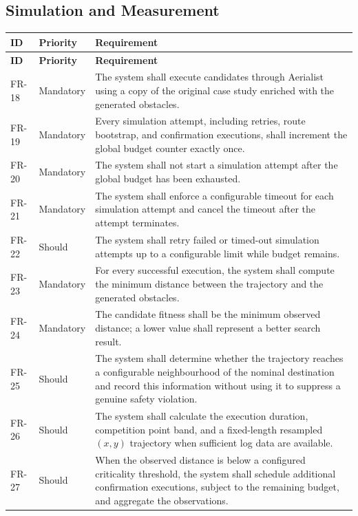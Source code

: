 \documentclass[11pt,a4paper]{report}
\begin{document}
\subsection{Simulation and Measurement}
\begin{longtable}{L{1.7cm} L{2.1cm} L{10.8cm}}
\toprule
\textbf{ID} & \textbf{Priority} & \textbf{Requirement}\\
\midrule
\endfirsthead
\toprule
\textbf{ID} & \textbf{Priority} & \textbf{Requirement}\\
\midrule
\endhead
FR-18 & Mandatory & The system shall execute candidates through Aerialist using a copy of the original case study enriched with the generated obstacles.\\
FR-19 & Mandatory & Every simulation attempt, including retries, route bootstrap, and confirmation executions, shall increment the global budget counter exactly once.\\
FR-20 & Mandatory & The system shall not start a simulation attempt after the global budget has been exhausted.\\
FR-21 & Mandatory & The system shall enforce a configurable timeout for each simulation attempt and cancel the timeout after the attempt terminates.\\
FR-22 & Should & The system shall retry failed or timed-out simulation attempts up to a configurable limit while budget remains.\\
FR-23 & Mandatory & For every successful execution, the system shall compute the minimum distance between the trajectory and the generated obstacles.\\
FR-24 & Mandatory & The candidate fitness shall be the minimum observed distance; a lower value shall represent a better search result.\\
FR-25 & Should & The system shall determine whether the trajectory reaches a configurable neighbourhood of the nominal destination and record this information without using it to suppress a genuine safety violation.\\
FR-26 & Should & The system shall calculate the execution duration, competition point band, and a fixed-length resampled $(x,y)$ trajectory when sufficient log data are available.\\
FR-27 & Should & When the observed distance is below a configured criticality threshold, the system shall schedule additional confirmation executions, subject to the remaining budget, and aggregate the observations.\\
\bottomrule
\end{longtable}
\end{document}
